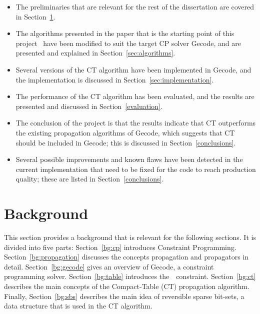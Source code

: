 \documentclass[a4paper,11pt]{article}
\newcommand{\Secref}[1]{Section~\ref{#1}}
\newcommand{\Table}{\Constraint{Table}}
\numberwithin{equation}{section}
\begin{document}
\begin{itemize}
  \item The preliminaries that are relevant for the rest of the dissertation
    are covered in \Secref{bg}.

  \item The algorithms presented in the paper that is the starting point of this 
    project~\cite{DBLP:conf/cp/DemeulenaereHLP16} 
    have been modified to suit the target CP solver Gecode, and are presented and explained in 
    \Secref{sec:algorithms}.

  \item Several versions of the CT algorithm have been implemented in Gecode, and
    the implementation is discussed in \Secref{sec:implementation}.

  \item The performance of the CT algorithm has been evaluated,
    and the results
    are presented and discussed in \Secref{evaluation}.

  \item The conclusion of the project is that the results indicate
    that CT outperforms the existing propagation algorithms of Gecode, which
    suggests that CT should be included in Gecode; this is discussed
    in \Secref{conclusions}.

  \item Several possible improvements and known flaws have been detected in the current
    implementation that need to be fixed for the code to reach production 
    quality; these are listed in \Secref{conclusions}.
        
\end{itemize}

\section{Background}
\label{bg}


This section provides a background that is relevant for the
following sections. It is divided into five parts: \Secref{bg:cp}
introduces Constraint Programming. \Secref{bg:propagation} discusses
the concepts propagation and propagators in detail.
\Secref{bg:gecode} gives an overview
of Gecode, a constraint programming solver.
\Secref{bg:table} introduces the~\Table~constraint.
\Secref{bg:ct} describes the main concepts of the 
Compact-Table (CT) propagation algorithm.
Finally, \Secref{bg:sbs} 
describes the main idea of reversible sparse bit-sets,
a data structure that is used in the CT algorithm.
\end{document}
